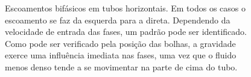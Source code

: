 \begin{figure}[h!]
\begin{center}
	\end{center}
	\caption[Escoamentos bifásicos em tubos horizontais.]{Escoamentos
	bifásicos em tubos horizontais. Em todos os casos o escoamento se
	faz da esquerda para a direta. Dependendo da velocidade de entrada
	das fases, um padrão pode ser identificado. Como pode ser verificado
	pela posição das bolhas, a gravidade exerce uma influência imediata
	nas fases, uma vez que o fluido menos denso tende a se movimentar na
	parte de cima do tubo.}
  \label{fig:horizontal} 
\end{figure}

